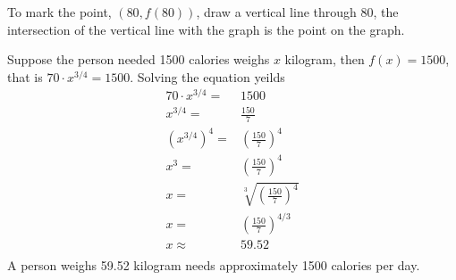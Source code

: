 \documentclass[
  12pt]{article}
\begin{document}
\begin{enumerate}
  To mark the point, \((80, f(80))\), draw a vertical line through
  \(80\), the intersection of the vertical line with the graph is the
  point on the graph.

  Suppose the person needed 1500 calories weighs \(x\) kilogram, then
  \(f(x)=1500\), that is \(70\cdot x^{3/4}=1500\). Solving the equation
  yeilds \[
  \begin{aligned}
  70\cdot x^{3/4}=&1500\\
  x^{3/4}=&\frac{150}{7}\\
  (x^{3/4})^4=&(\frac{150}{7})^4\\
  x^3=&(\frac{150}{7})^4\\
  x=&\sqrt[3]{(\frac{150}{7})^4}\\
  x=&(\frac{150}{7})^{4/3}\\
  x\approx & 59.52\\
  \end{aligned}
  \] A person weighs 59.52 kilogram needs approximately 1500 calories
  per day.
\end{enumerate}
\end{document}
